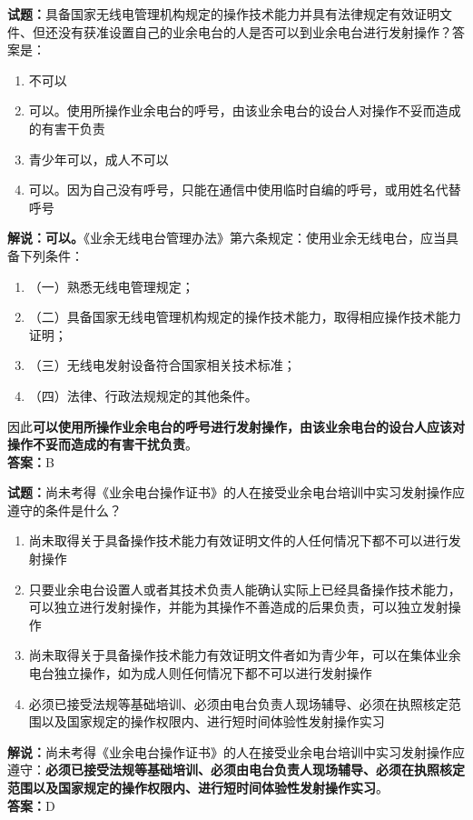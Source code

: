 \documentclass{ctexbook}
\begin{document}

\bigskip


\noindent\textbf{试题：}具备国家无线电管理机构规定的操作技术能力并具有法律规定有效证明文件、但还没有获准设置自己的业余电台的人是否可以到业余电台进行发射操作？答案是：
\begin{enumerate}[leftmargin=3em]
\item 不可以
\item 可以。使用所操作业余电台的呼号，由该业余电台的设台人对操作不妥而造成的有害干负责
\item 青少年可以，成人不可以
\item 可以。因为自己没有呼号，只能在通信中使用临时自编的呼号，或用姓名代替呼号
\end{enumerate}
\noindent\textbf{解说：可以。}《业余无线电台管理办法》第六条规定：使用业余无线电台，应当具备下列条件：
\begin{enumerate}[label=, leftmargin=0.8em]
\item （一）熟悉无线电管理规定；
\item （二）具备国家无线电管理机构规定的操作技术能力，取得相应操作技术能力证明；
\item （三）无线电发射设备符合国家相关技术标准；
\item （四）法律、行政法规规定的其他条件。
\end{enumerate}
因此\textbf{可以使用所操作业余电台的呼号进行发射操作，由该业余电台的设台人应该对操作不妥而造成的有害干扰负责}。\\\noindent\textbf{答案：}B



\bigskip


\noindent\textbf{试题：}尚未考得《业余电台操作证书》的人在接受业余电台培训中实习发射操作应遵守的条件是什么？
\begin{enumerate}[leftmargin=3em]
\item 尚未取得关于具备操作技术能力有效证明文件的人任何情况下都不可以进行发射操作
\item 只要业余电台设置人或者其技术负责人能确认实际上已经具备操作技术能力，可以独立进行发射操作，并能为其操作不善造成的后果负责，可以独立发射操作
\item 尚未取得关于具备操作技术能力有效证明文件者如为青少年，可以在集体业余电台独立操作，如为成人则任何情况下都不可以进行发射操作
\item 必须已接受法规等基础培训、必须由电台负责人现场辅导、必须在执照核定范围以及国家规定的操作权限内、进行短时间体验性发射操作实习
\end{enumerate}
\noindent\textbf{解说：}尚未考得《业余电台操作证书》的人在接受业余电台培训中实习发射操作应遵守：\textbf{必须已接受法规等基础培训、必须由电台负责人现场辅导、必须在执照核定范围以及国家规定的操作权限内、进行短时间体验性发射操作实习}。\\\noindent\textbf{答案：}D
\end{document}
